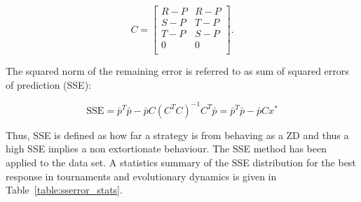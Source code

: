 \documentclass[10pt]{article}
\begin{document}
\begin{equation}\label{eq:definition_of_C}
    C =
    \begin{bmatrix}
        R - P & R- P \\
        S - P & T- P \\
        T - P & S- P \\
        0     & 0 \\
    \end{bmatrix}.
\end{equation}

The squared norm of the remaining error is referred to as sum of squared errors
of prediction (SSE):

\begin{equation}\label{eqn:x_SSError_formula}
    \text{SSE} = {\bar{p}} ^ T \bar{p} -
           \bar{p} C \left(C ^ T C \right) ^ {-1} C ^ T \bar{p}
         = {\bar{p}} ^ T \bar{p} - \bar{p} C x ^ *
\end{equation}

Thus, SSE is defined as how far a strategy is from behaving as a ZD and thus a
high SSE implies a non extortionate behaviour. The SSE method has been applied
to the data set. A statistics summary of the SSE distribution for the best
response in tournaments and evolutionary dynamics is given in
Table~\ref{table:sserror_stats}.

\begin{table}[!htbp]
    \begin{center}
    \end{center}
    \caption{SSE of best response memory-one when \(N=2\)}\label{table:sserror_stats}
\end{table}
\end{document}
